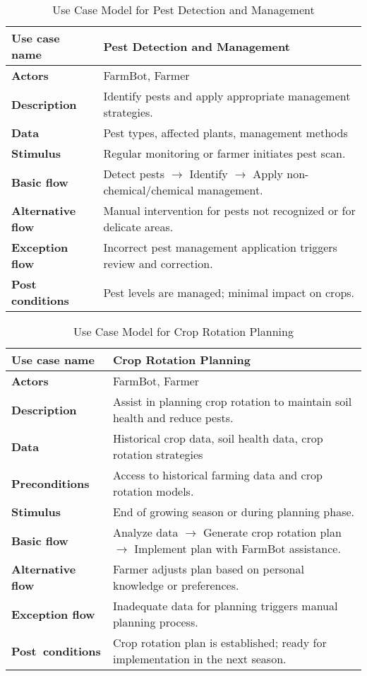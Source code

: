 \begin{table}[H]
\centering
\begin{tabular}{|p{4cm}|p{9cm}|}
\hline
\textbf{Use case name}    & Pest Detection and Management \\
\hline
\textbf{Actors}           & FarmBot, Farmer \\
\hline
\textbf{Description}      & Identify pests and apply appropriate management strategies. \\
\hline
\textbf{Data}             & Pest types, affected plants, management methods \\
\hline
\textbf{Stimulus}         & Regular monitoring or farmer initiates pest scan. \\
\hline
\textbf{Basic flow}       & Detect pests $\rightarrow$ Identify $\rightarrow$ Apply non-chemical/chemical management. \\
\hline
\textbf{Alternative flow} & Manual intervention for pests not recognized or for delicate areas. \\
\hline
\textbf{Exception flow}   & Incorrect pest management application triggers review and correction. \\
\hline
\textbf{Post conditions}  & Pest levels are managed; minimal impact on crops. \\
\hline
\end{tabular}
\caption{Use Case Model for Pest Detection and Management}
\end{table}

\begin{table}[H]
\centering
\begin{tabular}{|p{4cm}|p{9cm}|}
\hline
\textbf{Use case name}    & Crop Rotation Planning \\
\hline
\textbf{Actors}           & FarmBot, Farmer \\
\hline
\textbf{Description}      & Assist in planning crop rotation to maintain soil health and reduce pests. \\
\hline
\textbf{Data}             & Historical crop data, soil health data, crop rotation strategies \\
\hline
\textbf{Preconditions}    & Access to historical farming data and crop rotation models. \\
\hline
\textbf{Stimulus}         & End of growing season or during planning phase. \\
\hline
\textbf{Basic flow}       & Analyze data $\rightarrow$ Generate crop rotation plan $\rightarrow$ Implement plan with FarmBot assistance. \\
\hline
\textbf{Alternative flow} & Farmer adjusts plan based on personal knowledge or preferences. \\
\hline
\textbf{Exception flow}   & Inadequate data for planning triggers manual planning process. \\
\hline
\textbf{Post conditions}  & Crop rotation plan is established; ready for implementation in the next season. \\
\hline
\end{tabular}
\caption{Use Case Model for Crop Rotation Planning}
\end{table}


